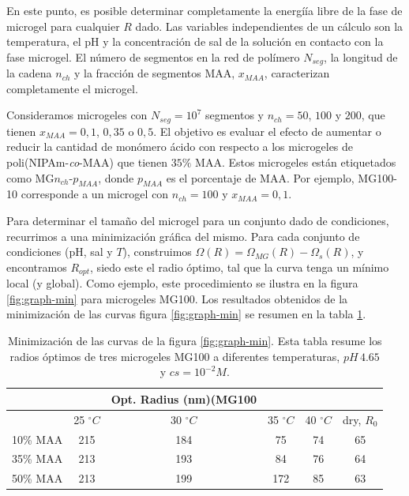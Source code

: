 En este punto, es posible determinar completamente la energí\'ia libre de la fase de microgel para cualquier $R$ dado.
Las variables independientes de un c\'alculo son la temperatura, el pH y la concentraci\'on de sal de la soluci\'on en contacto con la fase microgel.
El n\'umero de segmentos en la red de pol\'imero $N_{seg}$, la longitud de la cadena $n_{ch}$ y la fracci\'on de segmentos MAA, $x_{MAA}$, caracterizan completamente el microgel.


Consideramos microgeles con $N_{seg}=10^7$ segmentos y $n_{ch}=50$, $100$ y $200$, que tienen $x_{MAA}=0,1$, $0,35$ o $0,5$.
El objetivo es evaluar el efecto de aumentar o reducir la cantidad de mon\'omero \'acido con respecto a los microgeles de poli(NIPAm-\emph{co}-MAA) que tienen $35\%$ MAA. %
Estos microgeles est\'an etiquetados como MG$n_{ch}$-$p_{MAA}$, donde $p_{MAA}$ es el porcentaje de MAA.
Por ejemplo, MG100-10 corresponde a un  microgel con $n_{ch}=100$ y $x_{MAA}=0,1$.


Para determinar el tama\~no del microgel para un conjunto dado de condiciones, recurrimos a una minimizaci\'on gr\'afica del mismo.
Para cada conjunto de condiciones (pH, sal y $T$), construimos $\Omega(R)=\Omega_{MG}(R)-\Omega_{s}(R)$, y encontramos $R_{opt }$, siedo este el radio \'optimo, tal que la curva tenga un m\'inimo local (y global).
Como ejemplo, este procedimiento se ilustra en la figura \ref{fig:graph-min} para microgeles MG100.
Los resultados obtenidos de la minimizaci\'on de las curvas figura \ref{fig:graph-min} se resumen en la tabla \ref{table:optimal-R}.

\begin{table}[!htb]
\centering
\small
  \begin{tabular}{|lccccc|}
   \hline %
    	&&   Opt. Radius (nm)(MG100 & && \\
    	\hline
      & {25 $^\circ C$} & {30 $^\circ C$} & {35 $^\circ C$} & {40 $^\circ C$} & {dry, $R_0$} \\
      \hline
    10\% MAA & 215 &  184 &  75  &  74 & 65\\
    35\% MAA &  213 &  193 &  84 & 76 & 64\\
    50\% MAA &  213 & 199 &  172 & 85 & 63\\
    \hline
  \end{tabular}
 \caption{Minimizaci\'on de las curvas de la  figura \ref{fig:graph-min}.
 	Esta tabla resume los radios \'optimos de tres microgeles MG100 a diferentes temperaturas, $pH\,4.65$ y $cs=10^{-2}M$.}
\label{table:optimal-R} 
\end{table}


